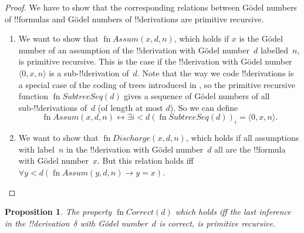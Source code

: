 \documentclass[10pt,a4paper]{article}
\makeatletter
\theoremstyle{plain}
\newtheorem{prop}[thm]{Proposition}
\theoremstyle{definition}
\theoremstyle{remark}
\newcommand*{\ollabel}[1]{\label{#1}}
\newcommand{\olref}{\@ifnextchar[{\olref@i}{\olref@final}}
\def\olref@i[#1]{\@ifnextchar[{\olref@ii}{\olref@final}}
\def\olref@ii[#1]{\@ifnextchar[{\olref@iii}{\olref@final}}
\def\olref@iii[#1]{\olref@final}
\def\olref@final#1{\ref{#1}}
\providecommand{\lif}{\mathbin{\rightarrow}}
\providecommand{\tuple}[1]{\langle #1 \rangle}
\providecommand{\bforall}{\forall}
\providecommand{\bexists}{\exists}
\providecommand{\defiff}{\mathrel{\leftrightarrow}}
\providecommand{\fn}{\operatorname{fn}}
\makeatother
\begin{document}
\begin{proof}
  We have to show that the corresponding relations between G\"odel
  numbers of !!{formula}s and G\"odel numbers of !!{derivation}s are
  primitive recursive.
  \begin{enumerate}
  \item We want to show that $\fn{Assum}(x, d, n)$, which holds if $x$
    is the G\"odel number of an assumption of the !!{derivation} with
    G\"odel number~$d$ labelled~$n$, is primitive recursive.  This is
    the case if the !!{derivation} with G\"odel number~$\tuple{0, x,
      n}$ is a sub-!!{derivation} of~$d$. Note that the way we code
    !!{derivation}s is a special case of the coding of trees introduced in
    \olref[cmp][rec][tre]{sec}, so the primitive recursive function
    $\fn{SubtreeSeq}(d)$ gives a sequence of G\"odel numbers of all
    sub-!!{derivation}s of~$d$ (of length at most $d$). So we can
    define
    \[
    \fn{Assum}(x, d, n) \defiff \bexists{i<d}{(\fn{SubtreeSeq}(d))_i =
      \tuple{0, x, n}}.
    \]
  \item We want to show that $\fn{Discharge}(x, d, n)$, which holds if
    all assumptions with label~$n$ in the !!{derivation} with G\"odel
    number~$d$ all are the !!{formula} with G\"odel number~$x$.  But
    this relation holds iff $\bforall{y<d}{(\fn{Assum}(y, d, n) \lif y
      = x)}$.
  \end{enumerate}
\end{proof}

\begin{prop}
  \ollabel{prop:followsby}
  The property $\fn{Correct}(d)$ which holds iff the last inference in
  the !!{derivation}~$\delta$ with G\"odel number~$d$ is correct, is
  primitive recursive.
\end{prop}
\end{document}
